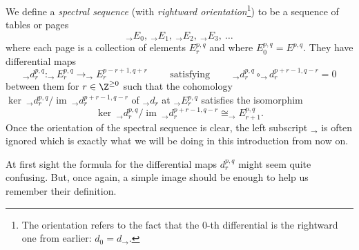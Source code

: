 \begin{definition}
    We define a \textit{spectral sequence} (with \textit{rightward orientation}\footnote{The orientation refers to the fact that the $0$-th differential is the rightward one from earlier: $d_0 = d_\rightarrow$.}) to be a sequence of tables or pages 
    \begin{equation*}
        _\rightarrow E_0,\ _\rightarrow E_1,\ 
        _\rightarrow E_2,\ _\rightarrow E_3,\ \dots  
    \end{equation*}
    where each page is a collection of elements $E_r^{p,q}$ and where $E^{p,q}_0 = E^{p,q}$.
    They have  differential maps 
    \begin{equation*}
        _\rightarrow d_r^{p,q}: _\rightarrow E_r^{p,q} \longrightarrow _\rightarrow E_r^{p-r+1, q+r} \qquad \text{ satisfying }\qquad _\rightarrow d_r^{p,q} \circ _\rightarrow d_r^{p+r-1, q-r} = 0
    \end{equation*}
    between them for $r\in \Z^{\geq 0}$ such that the cohomology $\ker\ _\rightarrow d_r^{p,q}/ \operatorname{im}\ _\rightarrow d_r^{p+r-1, q-r}$ of $_\rightarrow d_r$ at $_\rightarrow E_r^{p,q}$ satisfies the isomorphim
    \begin{equation}\label{cohomologyiso}
        \ker\ _\rightarrow d_r^{p,q}/ \operatorname{im}\ _\rightarrow d_r^{p+r-1, q-r} \cong _\rightarrow E_{r+1}^{p,q}.
    \end{equation}
    Once the orientation of the spectral sequence is clear, the left subscript $_\rightarrow$ is often ignored which is exactly what we will be doing in this introduction from now on.
\end{definition}
At first sight the formula for the differential maps $d_r^{p,q}$  might seem quite confusing. But, once again, a simple image should be enough to help us remember their definition. 

